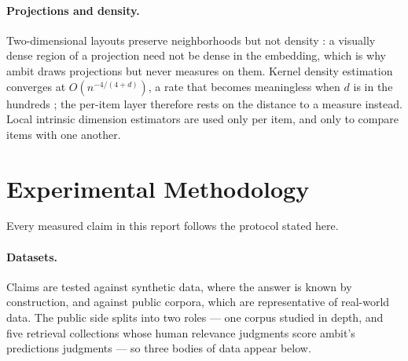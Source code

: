 \documentclass[11pt,letterpaper]{article}
\begin{document}
\paragraph{Projections and density.}
Two-dimensional layouts preserve neighborhoods but not density
\cite{wattenberg2016,narayan2021}: a visually dense region of a projection
need not be dense in the embedding, which is why \textsf{ambit} draws
projections but never measures on them. Kernel density estimation
converges at $O(n^{-4/(4+d)})$, a rate that becomes meaningless when $d$
is in the hundreds \cite{silverman1986}; the per-item layer therefore
rests on the distance to a measure instead. Local intrinsic dimension
estimators \cite{levina2005,facco2017} are used only per item, and only to
compare items with one another.

\section{Experimental Methodology}
\label{sec:method}

Every measured claim in this report follows the protocol stated
here.

\paragraph{Datasets.}
Claims are tested against synthetic data, where the answer is known by
construction, and against public corpora, which are representative of real-world
data.
The public side splits into two roles --- one corpus studied in depth, and five retrieval collections whose
human relevance judgments score \textsf{ambit}'s predictions judgments --- so
three bodies of data appear below.
\end{document}
